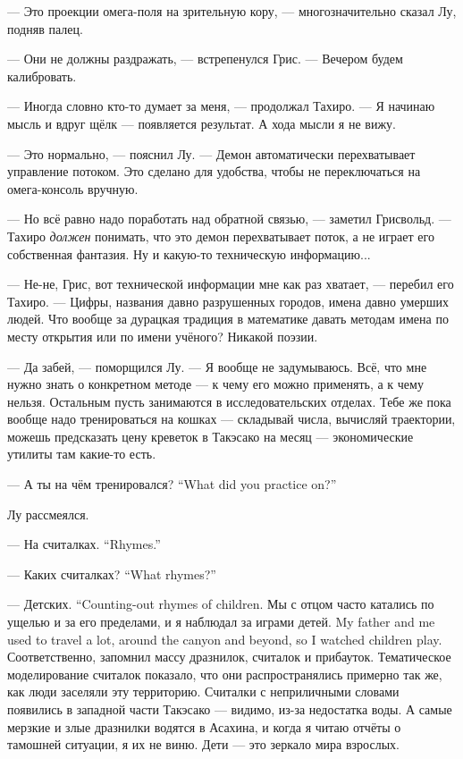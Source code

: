 --- Это проекции омега-поля на зрительную кору, --- многозначительно сказал Лу, подняв палец.

--- Они не должны раздражать, --- встрепенулся Грис.
--- Вечером будем калибровать.

--- Иногда словно кто-то думает за меня, --- продолжал Тахиро.
--- Я начинаю мысль и вдруг щёлк --- появляется результат.
А хода мысли я не вижу.

--- Это нормально, --- пояснил Лу.
--- Демон автоматически перехватывает управление потоком.
Это сделано для удобства, чтобы не переключаться на омега-консоль вручную.

--- Но всё равно надо поработать над обратной связью, --- заметил Грисвольд.
--- Тахиро \emph{должен} понимать, что это демон перехватывает поток, а не играет его собственная фантазия.
Ну и какую-то техническую информацию...

--- Не-не, Грис, вот технической информации мне как раз хватает, --- перебил его Тахиро.
--- Цифры, названия давно разрушенных городов, имена давно умерших людей.
Что вообще за дурацкая традиция в математике давать методам имена по месту открытия или по имени учёного?
Никакой поэзии.

--- Да забей, --- поморщился Лу.
--- Я вообще не задумываюсь.
Всё, что мне нужно знать о конкретном методе --- к чему его можно применять, а к чему нельзя.
Остальным пусть занимаются в исследовательских отделах.
Тебе же пока вообще надо тренироваться на кошках --- складывай числа, вычисляй траектории, можешь предсказать цену креветок в Такэсако на месяц --- экономические утилиты там какие-то есть.

{--- А ты на чём тренировался?}
{``What did you practice on?''}

Лу рассмеялся.

{--- На считалках.}
{``Rhymes.''}

{--- Каких считалках?}
{``What rhymes?''}

{--- Детских.}
{``Counting-out rhymes of children.}
{Мы с отцом часто катались по ущелью и за его пределами, и я наблюдал за играми детей.}
{My father and me used to travel a lot, around the canyon and beyond, so I watched children play.}
Соответственно, запомнил массу дразнилок, считалок и прибауток.
Тематическое моделирование считалок показало, что они распространялись примерно так же, как люди заселяли эту территорию.
Считалки с неприличными словами появились в западной части Такэсако --- видимо, из-за недостатка воды.
А самые мерзкие и злые дразнилки водятся в Асахина, и когда я читаю отчёты о тамошней ситуации, я их не виню.
Дети --- это зеркало мира взрослых.

